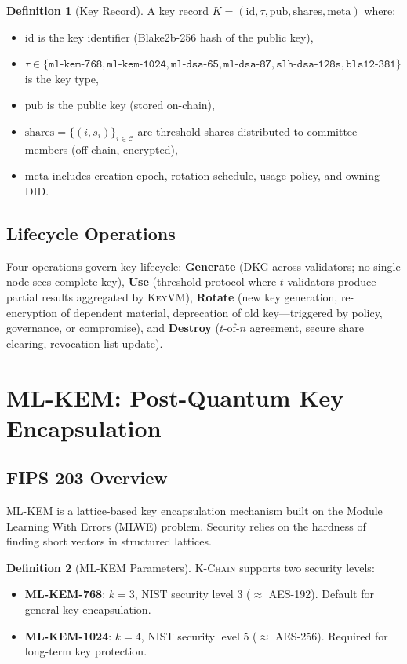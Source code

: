 \documentclass[11pt,letterpaper]{article}
\theoremstyle{definition}
\newtheorem{definition}{Definition}
\theoremstyle{remark}
\newcommand{\KChain}{\textsc{K-Chain}}
\newcommand{\KeyVM}{\textsc{KeyVM}}
\begin{document}
\begin{definition}[Key Record]
A key record $K = (\text{id}, \tau, \text{pub}, \text{shares}, \text{meta})$ where:
\begin{itemize}
\item $\text{id}$ is the key identifier (Blake2b-256 hash of the public key),
\item $\tau \in \{\texttt{ml-kem-768}, \texttt{ml-kem-1024}, \texttt{ml-dsa-65}, \texttt{ml-dsa-87}, \texttt{slh-dsa-128s}, \texttt{bls12-381}\}$ is the key type,
\item $\text{pub}$ is the public key (stored on-chain),
\item $\text{shares} = \{(i, s_i)\}_{i \in \mathcal{C}}$ are threshold shares distributed to committee members (off-chain, encrypted),
\item $\text{meta}$ includes creation epoch, rotation schedule, usage policy, and owning DID.
\end{itemize}
\end{definition}

\subsection{Lifecycle Operations}

Four operations govern key lifecycle: \textbf{Generate} (DKG across validators; no single node sees complete key), \textbf{Use} (threshold protocol where $t$ validators produce partial results aggregated by \KeyVM{}), \textbf{Rotate} (new key generation, re-encryption of dependent material, deprecation of old key---triggered by policy, governance, or compromise), and \textbf{Destroy} ($t$-of-$n$ agreement, secure share clearing, revocation list update).

\section{ML-KEM: Post-Quantum Key Encapsulation}

\subsection{FIPS 203 Overview}

ML-KEM is a lattice-based key encapsulation mechanism built on the Module Learning With Errors (MLWE) problem. Security relies on the hardness of finding short vectors in structured lattices.

\begin{definition}[ML-KEM Parameters]
\KChain{} supports two security levels:
\begin{itemize}
\item \textbf{ML-KEM-768}: $k=3$, NIST security level 3 ($\approx$ AES-192). Default for general key encapsulation.
\item \textbf{ML-KEM-1024}: $k=4$, NIST security level 5 ($\approx$ AES-256). Required for long-term key protection.
\end{itemize}
\end{definition}
\end{document}
